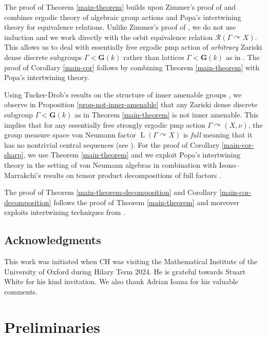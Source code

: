 \documentclass[11pt]{amsart}
\numberwithin{equation}{section}
\theoremstyle{plain}
\theoremstyle{definition}
\newcommand{\rL}{\operatorname{L}}
\begin{document}
The proof of Theorem \ref{main-theorem} builds upon Zimmer's proof of \cite[Theorem 1.1]{Zi81} and combines ergodic theory of algebraic group actions and Popa's intertwining theory for equivalence relations. Unlike Zimmer's proof of \cite[Theorem 1.1]{Zi81}, we do not use induction and we work directly with the orbit equivalence relation $\mathscr R(\Gamma \curvearrowright X)$. This allows us to deal with essentially free ergodic pmp action of {\em arbitrary} Zariski dense discrete subgroups $\Gamma < \mathbf G(k)$ rather than lattices $\Gamma < \mathbf G(k)$ as in \cite{Zi81}. The proof of Corollary \ref{main-cor} follows by combining Theorem \ref{main-theorem} with Popa's intertwining theory. 


Using Tucker-Drob's results on the structure of inner amenable groups \cite{TD14}, we observe in Proposition \ref{prop-not-inner-amenable} that any Zariski dense discrete subgroup $\Gamma < \mathbf G(k)$ as in Theorem \ref{main-theorem} is not inner amenable. This implies that for any essentially free strongly ergodic pmp action $\Gamma \curvearrowright (X, \nu)$, the group measure space von Neumann factor $\rL(\Gamma \curvearrowright X)$ is {\em full} meaning that it has no nontrivial central sequences (see \cite{Ch81}). For the proof of Corollary \ref{main-cor-sharp}, we use Theorem \ref{main-theorem} and we exploit Popa's intertwining theory in the setting of von Neumann algebras in combination with Isono--Marrakchi's results on tensor product decompositions of full factors \cite{IM19}.


The proof of Theorem \ref{main-theorem-decomposition} and Corollary \ref{main-cor-decomposition} follows the proof of Theorem \ref{main-theorem} and moreover exploits intertwining techniques from \cite{Dr19}.


\subsection*{Acknowledgments} This work was initiated when CH was visiting the Mathematical Institute of the University of Oxford during Hilary Term 2024. He is grateful towards Stuart White for his kind invitation. We also thank Adrian Ioana for his valuable comments.


%



\section{Preliminaries}\label{preliminaries}
\end{document}
